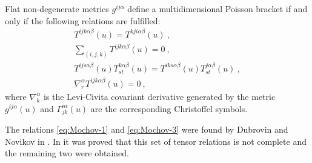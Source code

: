 \begin{theorem}[Mokhov]
    Flat non-degenerate metrics $g^{ij \alpha}$ define a multidimensional Poisson bracket if and only if the following relations are fulfilled:
    \begin{align}
        T^{ijk \alpha \beta}(u) = T^{kji \alpha \beta}(u) \:, \label{eq:Mochov-1}\\
        \sum_{(i,j,k)} T^{ijk \alpha \beta}(u) = 0 \:, \label{eq:Mochov-2}\\
        T^{ij s \alpha \beta}(u) T^{k \alpha \beta}_{st}(u) = T^{i k s \alpha \beta}(u) T^{j \alpha \beta}_{st} (u) \:, \label{eq:Mochov-3}\\
        \nabla^\alpha_r T^{ijk \alpha \beta}(u) = 0 \:, \label{eq:Mochov-4}
    \end{align}
    where $\nabla^\alpha_k$ is the Levi-Civita covariant derivative generated by the metric $g^{ij \alpha}(u)$ and $\Gamma^{i \alpha}_{jk}(u)$ are the corresponding Christoffel symbols. 
\end{theorem}

\begin{remark}
    The relations \eqref{eq:Mochov-1} and \eqref{eq:Mochov-3} were found by Dubrovin and Novikov in \cite{Dubrovin-Novikov}. In \cite{Mochov} it was proved that this set of tensor relations is not complete and the remaining two were obtained.
\end{remark}